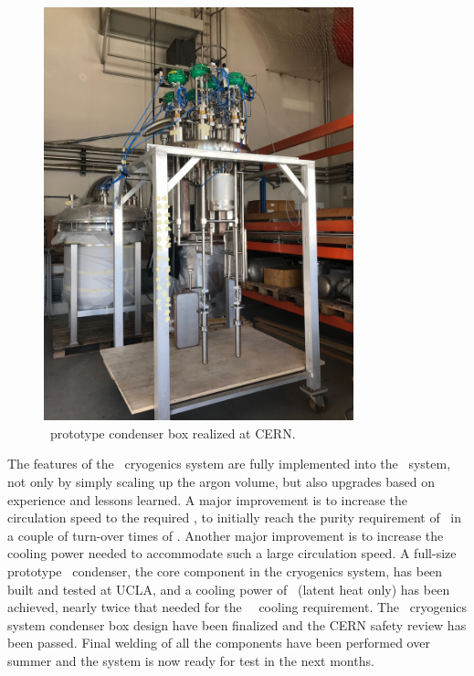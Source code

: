 \begin{figure}[!t]
\includegraphics[angle=-90,width=0.8\textwidth]{./Figures/condenser_box_picture.jpg}
\caption[\DSks\ condenser box at CERN]{\DSks\ prototype condenser box realized at CERN.}
\label{fig:DSCondenserPicture}
\end{figure}

The features of the \DSfs\ cryogenics system are fully implemented into the \DSks\ system, not only by simply scaling up the argon volume, but also upgrades based on experience and lessons learned.  A major improvement is to increase the circulation speed to the required \DSkCryogenicsGasFlowTotal, to initially reach the purity requirement of \LAr\ in a couple of turn-over times of \DSkUArTurnOverTime.  Another major improvement is to increase the cooling power needed to accommodate such a large circulation speed.  A full-size prototype \LAr\ condenser, the core component in the cryogenics system, has been built and tested at UCLA, and a cooling power of \DSkCryogenicsCondenserCoolingPowerMaxTested\ (latent heat only) has been achieved, nearly twice that needed for the \DSks\ \UAr\ cooling requirement.  
The  \UAr\ cryogenics system condenser box design have been finalized and the CERN safety review has been passed. Final welding of all the components have been performed over summer and the system is now ready for test in the next months.



